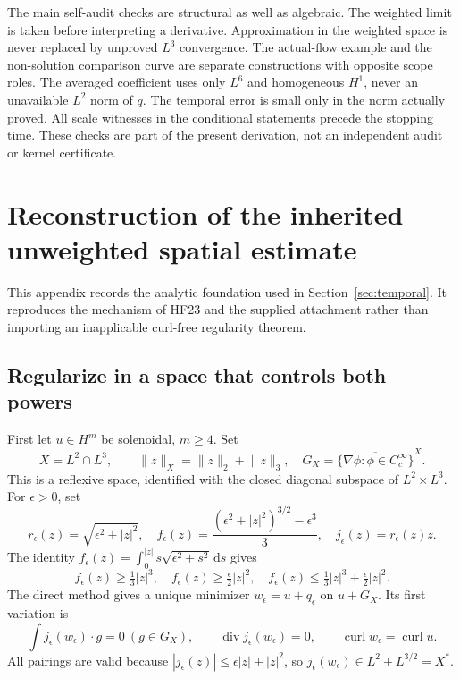 \documentclass[11pt,a4paper]{article}
\theoremstyle{definition}\newtheorem{definition}[theorem]{Definition}
\theoremstyle{remark}\newtheorem{remark}[theorem]{Remark}
\newcommand{\dd}{\,\mathrm d}
\newcommand{\norm}[1]{\lVert #1\rVert}
\newcommand{\diver}{\operatorname{div}}
\newcommand{\curl}{\operatorname{curl}}
\numberwithin{equation}{section}
\begin{document}
The main self-audit checks are structural as well as algebraic. The weighted limit is taken before interpreting a derivative. Approximation in the weighted space is never replaced by unproved $L^3$ convergence. The actual-flow example and the non-solution comparison curve are separate constructions with opposite scope roles. The averaged coefficient uses only $L^6$ and homogeneous $H^1$, never an unavailable $L^2$ norm of $q$. The temporal error is small only in the norm actually proved. All scale witnesses in the conditional statements precede the stopping time. These checks are part of the present derivation, not an independent audit or kernel certificate.

\appendix
\section{Reconstruction of the inherited unweighted spatial estimate}
\label{app:spatial}
This appendix records the analytic foundation used in Section~\ref{sec:temporal}. It reproduces the mechanism of HF23 and the supplied attachment rather than importing an inapplicable curl-free regularity theorem.

\subsection{Regularize in a space that controls both powers}
First let $u\in H^m$ be solenoidal, $m\ge4$. Set
\[
 X=L^2\cap L^3,\qquad \norm z_X=\norm z_2+\norm z_3,
 \quad G_X=\overline{\{\nabla\phi:\phi\in C_c^\infty\}}^X.
\]
This is a reflexive space, identified with the closed diagonal subspace of $L^2\times L^3$. For $\epsilon>0$, set
\[
 r_\epsilon(z)=\sqrt{\epsilon^2+|z|^2},\quad
 f_\epsilon(z)=\frac{(\epsilon^2+|z|^2)^{3/2}-\epsilon^3}{3},\quad
 j_\epsilon(z)=r_\epsilon(z)z.
\]
The identity $f_\epsilon(z)=\int_0^{|z|}s\sqrt{\epsilon^2+s^2}\dd s$ gives
\begin{equation}\label{eq:appendf}
 f_\epsilon(z)\ge\tfrac13|z|^3,\quad
 f_\epsilon(z)\ge\tfrac\epsilon2|z|^2,\quad
 f_\epsilon(z)\le\tfrac13|z|^3+\tfrac\epsilon2|z|^2.
\end{equation}
The direct method gives a unique minimizer $w_\epsilon=u+q_\epsilon$ on $u+G_X$. Its first variation is
\begin{equation}\label{eq:appendEL}
 \int j_\epsilon(w_\epsilon)\cdot g=0\ (g\in G_X),
 \qquad\diver j_\epsilon(w_\epsilon)=0,
 \qquad\curl w_\epsilon=\curl u.
\end{equation}
All pairings are valid because $|j_\epsilon(z)|\le\epsilon|z|+|z|^2$, so $j_\epsilon(w_\epsilon)\in L^2+L^{3/2}=X^*$.
\end{document}
